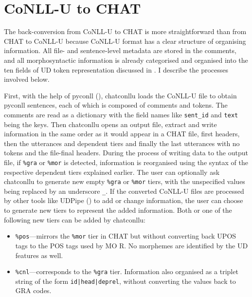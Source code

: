 \section{CoNLL-U to CHAT}

The back-conversion from CoNLL-U to CHAT is more straightforward than from CHAT to CoNLL-U because CoNLL-U format has a clear structure of organising information. All file- and sentence-level metadata are stored in the comments, and all morphosyntactic information is already categorised and organised into the ten fields of UD token representation discussed in . I describe the processes involved below.

First, with the help of pyconll (\cite{pyconll}), chatconllu loads the CoNLL-U file to obtain pyconll sentences, each of which is composed of comments and tokens. The comments are read as a dictionary with the field names like \texttt{sent\_id} and \texttt{text} being the keys. Then chatconllu opens an output file, extract and write information in the same order as it would appear in a CHAT file, first headers, then the utterances and dependent tiers and finally the last utterances with no tokens and the file-final headers. During the process of writing data to the output file, if \texttt{\%gra} or \texttt{\%mor} is detected, information is reorganised using the syntax of the respective dependent tiers explained earlier. The user can optionally ask chatconllu to generate new empty \texttt{\%gra} or \texttt{\%mor} tiers, with the unspecified values being replaced by an underscore \texttt{\_}. If the converted CoNLL-U files are processed by other tools like UDPipe (\cite{straka-etal-2016-udpipe}) to add or change information, the user can choose to generate new tiers to represent the added information. Both or one of the following new tiers can be added by chatconllu:
\begin{itemize}
	\item \texttt{\%pos}---mirrors the \texttt{\%mor} tier in CHAT but without converting back UPOS tags to the POS tags used by MO
	R. No morphemes are identified by the UD features as well.
	\item \texttt{\%cnl}---corresponds to the \texttt{\%gra} tier. Information also organised as a triplet string of the form \texttt{id|head|deprel}, without converting the values back to GRA codes.
\end{itemize}

